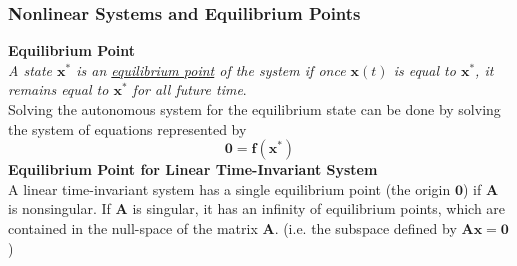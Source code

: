 \documentclass[11pt,handout]{beamer}   %
\begin{document}
\begin{frame}
\frametitle{Nonlinear Systems and Equilibrium Points}
\small
\textbf{Equilibrium Point}\\
\textit{A state $\mathbf{x}^*$ is an \underline{equilibrium point} of the system if once $\mathbf{x}(t)$ is equal to $\mathbf{x}^*$, it remains equal to $\mathbf{x}^*$ for all future time}.\\
\vspace{6pt}
Solving the autonomous system for the equilibrium state can be done by solving the system of equations represented by
\begin{equation*}
\mathbf{0} = \mathbf{f}(\mathbf{x}^*)
\end{equation*}
\textbf{Equilibrium Point for Linear Time-Invariant System}\\
A linear time-invariant system has a single equilibrium point (the origin $\mathbf{0}$) if $\mathbf{A}$ is nonsingular. If $\mathbf{A}$ is singular, it has an infinity of equilibrium points, which are contained in the null-space of the matrix $\mathbf{A}$. (i.e. the subspace defined by $\mathbf{Ax=0}$)\\
\vspace{6pt}
\end{frame}
\end{document}
